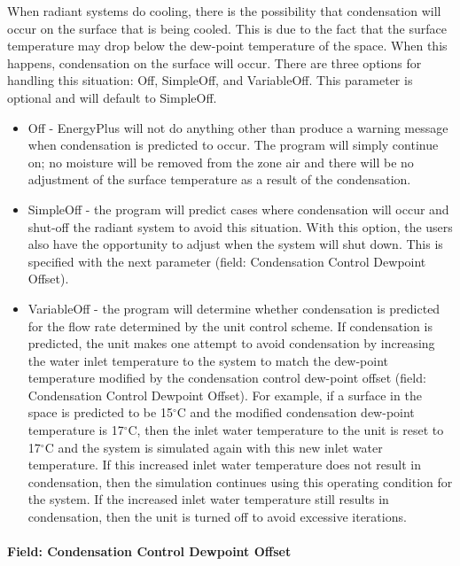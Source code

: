 When radiant systems do cooling, there is the possibility that condensation will occur on the surface that is being cooled. This is due to the fact that the surface temperature may drop below the dew-point temperature of the space. When this happens, condensation on the surface will occur. There are three options for handling this situation: Off, SimpleOff, and VariableOff. This parameter is optional and will default to SimpleOff.

\begin{itemize}
	\item
	Off - EnergyPlus will not do anything other than produce a warning message when condensation is predicted to occur. The program will simply continue on; no moisture will be removed from the zone air and there will be no adjustment of the surface temperature as a result of the condensation.
	\item
	SimpleOff - the program will predict cases where condensation will occur and shut-off the radiant system to avoid this situation. With this option, the users also have the opportunity to adjust when the system will shut down. This is specified with the next parameter (field: Condensation Control Dewpoint Offset).
	\item
	VariableOff - the program will determine whether condensation is predicted for the flow rate determined by the unit control scheme.  If condensation is predicted, the unit makes one attempt to avoid condensation by increasing the water inlet temperature to the system to match the dew-point temperature modified by the condensation control dew-point offset (field: Condensation Control Dewpoint Offset). For example, if a surface in the space is predicted to be 15$^\circ$C and the modified condensation dew-point temperature is 17$^\circ$C, then the inlet water temperature to the unit is reset to 17$^\circ$C and the system is simulated again with this new inlet water temperature.  If this increased inlet water temperature does not result in condensation, then the simulation continues using this operating condition for the system.  If the increased inlet water temperature still results in condensation, then the unit is turned off to avoid excessive iterations.
\end{itemize}

\paragraph{Field: Condensation Control Dewpoint Offset}\label{field-condensation-control-dewpoint-offset-2}

